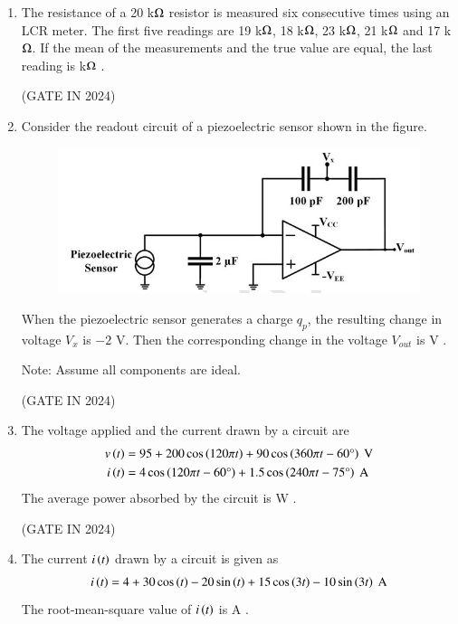 \documentclass[journal,12pt,onecolumn]{IEEEtran}
\theoremstyle{remark}
\begin{document}
\begin{enumerate}
    \item The resistance of a 20 k$\ohm$ resistor is measured six consecutive times using an LCR meter. The first five readings are 19 k$\ohm$, 18 k$\ohm$, 23 k$\ohm$, 21 k$\ohm$ and 17 k$\ohm$. If the mean of the measurements and the true value are equal, the last reading is \underline{\hspace{2cm}} k$\ohm$ .
    
    \hfill{(GATE IN 2024)}
    
    \item Consider the readout circuit of a piezoelectric sensor shown in the figure.
    \begin{figure}[H]
        \centering
        \includegraphics[width=0.7\columnwidth]{figs/p13.jpg}
        \caption*{}
        \label{fig:p13}
    \end{figure}
    When the piezoelectric sensor generates a charge $q_p$, the resulting change in voltage $V_x$ is $-2$ V. Then the corresponding change in the voltage $V_{out}$ is \underline{\hspace{2cm}} V .
    
    Note: Assume all components are ideal.
    
    \hfill{(GATE IN 2024)}
    
    \item The voltage applied and the current drawn by a circuit are
    \begin{align*}
        v\left(t\right) &= 95 + 200 \cos\left(120\pi t\right) + 90 \cos\left(360\pi t - 60\degree\right) \text{ V} \\
        i\left(t\right) &= 4 \cos\left(120\pi t - 60\degree\right) + 1.5 \cos\left(240\pi t - 75\degree\right) \text{ A}
    \end{align*}
    The average power absorbed by the circuit is \underline{\hspace{2cm}} W .
    
    \hfill{(GATE IN 2024)}
    
    \item The current $i\left(t\right)$ drawn by a circuit is given as
    \begin{align*}
        i\left(t\right) = 4 + 30 \cos\left(t\right) - 20 \sin\left(t\right) + 15 \cos\left(3t\right) - 10 \sin\left(3t\right) \text{ A}
    \end{align*}
    The root-mean-square value of $i\left(t\right)$ is \underline{\hspace{2cm}} A .
    

\end{enumerate}
\end{document}
